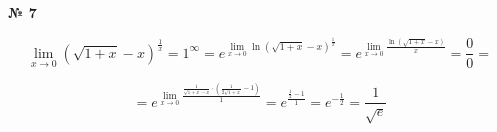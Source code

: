 \documentclass{article}
\begin{document}
\textbf{№ 7} 
\Large

$$ \lim\limits_{x \to 0} \left( \sqrt{1+x}-x \right)^{\frac{1}{x}}
= 1^{\infty}
= e^{\lim\limits_{x \to 0} \ln{\left( \sqrt{1+x}-x \right)^{\frac{1}{x}}}}
= e^{\lim\limits_{x \to 0} \frac{\ln{\left( \sqrt{1+x}-x \right)}}{x}} 
= \frac{0}{0}
= $$

$$ = e^{\lim\limits_{x \to 0} \frac{\frac{1}{\sqrt{1+x}-x} \cdot \left( \frac{1}{2\sqrt{1+x}}-1 \right)}{1}} 
= e^{\frac{\frac{1}{2}-1}{1}} 
= e^{-\frac{1}{2}} 
= \frac{1}{\sqrt{e}} $$
\end{document}
